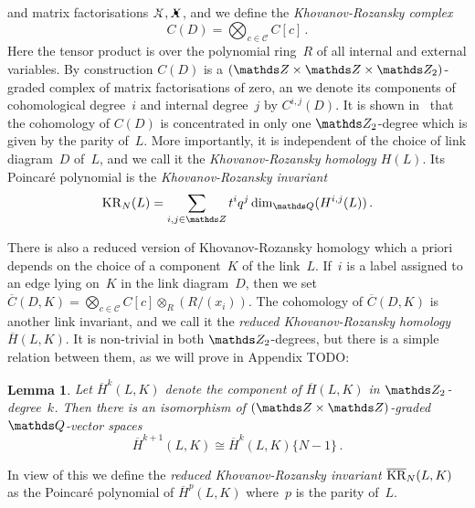 \documentclass{compositio}
\newtheorem{lemma}[theorem]{Lemma}
\theoremstyle{definition}
\numberwithin{equation}{section}
\begin{document}
\begin{minipage}{0.48cm}     
\end{minipage} 
and matrix factorisations $\Xcirc, \Xbul$, and we define the \emph{Khovanov-Rozansky complex}
$$
C(D) = \bigotimes_{c\in\mathcal C} C[c] \, .
$$
Here the tensor product is over the polynomial ring~$R$ of all internal and external variables. By construction $C(D)$ is a $(\nZ\times\nZ\times\nZ_{2})$-graded complex of matrix factorisations of zero, an we denote its components of cohomological degree~$i$ and internal degree~$j$ by $C^{i,j}(D)$. It is shown in~\cite{kr0401268} that the cohomology of $C(D)$ is concentrated in only one $\nZ_{2}$-degree which is given by the parity of~$L$. More importantly, it is independent of the choice of link diagram~$D$ of~$L$, and we call it the \emph{Khovanov-Rozansky homology $H(L)$}. Its Poincar\'e polynomial is the \emph{Khovanov-Rozansky invariant}
$$
\KR_{N}(L) = \sum_{i,j\in\nZ} t^{i} q^j \dim_{\nQ}(H^{i,j}(L)) \, . 
$$

There is also a reduced version of Khovanov-Rozansky homology which a priori depends on the choice of a component~$K$ of the link~$L$. If~$i$ is a label assigned to an edge lying on~$K$ in the link diagram~$D$, then we set $\overline{C}(D,K)=\bigotimes_{c\in\mathcal C} C[c] \otimes_{R}(R/(x_{i}))$. The cohomology of $\overline{C}(D,K)$ is another link invariant, and we call it the \emph{reduced Khovanov-Rozansky homology $\overline{H}(L,K)$}. It is non-trivial in both $\nZ_{2}$-degrees, but there is a simple relation between them, as we will prove in Appendix TODO: 
\begin{lemma}
\label{Z2gradingReduced}
Let $\overline{H}^k(L,K)$ denote the component of $\overline{H}(L,K)$ in $\nZ_{2}$-degree~$k$. Then there is an isomorphism of $(\nZ\times\nZ)$-graded $\nQ$-vector spaces 
$$
\overline{H}^{k+1}(L,K) \cong \overline{H}^k(L,K)\{N-1\} \, .
$$
\end{lemma}
In view of this we define the \emph{reduced Khovanov-Rozansky invariant $\overline{\operatorname{KR}}_{N}(L,K)$} as the Poincar\'e polynomial of $\overline{H}^p(L,K)$ where~$p$ is the parity of~$L$. 
\end{document}
